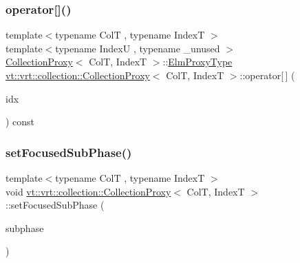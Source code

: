 \mbox{\label{structvt_1_1vrt_1_1collection_1_1_collection_proxy_a81f027fb0c7d2b55ec06a2f91dd8d72e}} 
\subsubsection{\texorpdfstring{operator[]()}{operator[]()}\hspace{0.1cm}{\footnotesize\ttfamily [2/2]}}
{\footnotesize\ttfamily template$<$typename ColT , typename IndexT $>$ \\
template$<$typename IndexU , typename \+\_\+unused $>$ \\
\hyperlink{structvt_1_1vrt_1_1collection_1_1_collection_proxy}{Collection\+Proxy}$<$ ColT, IndexT $>$\+::\hyperlink{structvt_1_1vrt_1_1collection_1_1_collection_proxy_a892c21eae1dca37321d7973f72b55b0a}{Elm\+Proxy\+Type} \hyperlink{structvt_1_1vrt_1_1collection_1_1_collection_proxy}{vt\+::vrt\+::collection\+::\+Collection\+Proxy}$<$ ColT, IndexT $>$\+::operator\mbox{[}$\,$\mbox{]} (\begin{DoxyParamCaption}\item[{IndexU const \&}]{idx }\end{DoxyParamCaption}) const}

\mbox{\label{structvt_1_1vrt_1_1collection_1_1_collection_proxy_a3b39db2b0516118989cd6647f61bc9fd}} 
\subsubsection{\texorpdfstring{set\+Focused\+Sub\+Phase()}{setFocusedSubPhase()}}
{\footnotesize\ttfamily template$<$typename ColT , typename IndexT $>$ \\
void \hyperlink{structvt_1_1vrt_1_1collection_1_1_collection_proxy}{vt\+::vrt\+::collection\+::\+Collection\+Proxy}$<$ ColT, IndexT $>$\+::set\+Focused\+Sub\+Phase (\begin{DoxyParamCaption}\item[{\hyperlink{namespacevt_ae78cbfdf1e57470e33eedb074f2beeba}{Subphase\+Type}}]{subphase }\end{DoxyParamCaption})}

